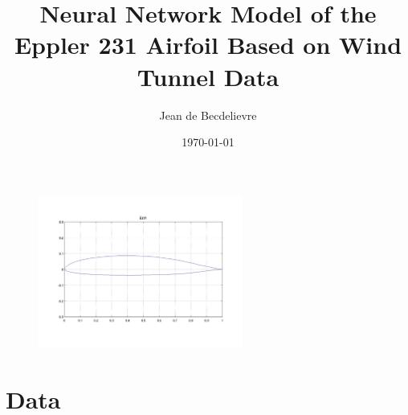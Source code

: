 \documentclass[letterpaper,12pt]{article}
\begin{document}
\title{Neural Network Model of the Eppler 231 Airfoil Based on Wind Tunnel Data}
\author{Jean de Becdelievre}
\date{\today}
\maketitle



\begin{figure}[H]
    \centering
    \includegraphics[width=0.6\textwidth]{e231}
    \label{fig:outline}%
\end{figure}

\section{Data}
\end{document}
